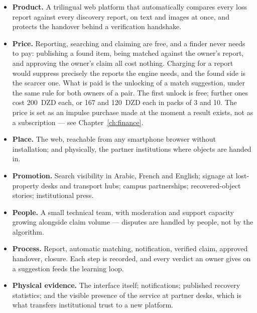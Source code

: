 \begin{itemize}[leftmargin=1.4em,itemsep=4pt]
  \item \textbf{Product.} A trilingual web platform that automatically compares
        every loss report against every discovery report, on text and images at
        once, and protects the handover behind a verification handshake.

  \item \textbf{Price.} Reporting, searching and claiming are free, and a finder
        never needs to pay: publishing a found item, being matched against the
        owner's report, and approving the owner's claim all cost nothing.
        Charging for a report would suppress precisely the reports the engine
        needs, and the found side is the scarcer one. What is paid is the
        unlocking of a match suggestion, under the same rule for both owners of
        a pair. The first unlock is free; further ones cost 200~DZD each, or 167
        and 120~DZD each in packs of 3 and 10. The price is set as an impulse
        purchase made at the moment a result exists, not as a subscription ---
        see Chapter~\ref{ch:finance}.

  \item \textbf{Place.} The web, reachable from any smartphone browser without
        installation; and physically, the partner institutions where objects are
        handed in.

  \item \textbf{Promotion.} Search visibility in Arabic, French and English;
        signage at lost-property desks and transport hubs; campus partnerships;
        recovered-object stories; institutional press.

  \item \textbf{People.} A small technical team, with moderation and support
        capacity growing alongside claim volume --- disputes are handled by
        people, not by the algorithm.

  \item \textbf{Process.} Report, automatic matching, notification, verified
        claim, approved handover, closure. Each step is recorded, and every
        verdict an owner gives on a suggestion feeds the learning loop.

  \item \textbf{Physical evidence.} The interface itself; notifications;
        published recovery statistics; and the visible presence of the service
        at partner desks, which is what transfers institutional trust to a new
        platform.
\end{itemize}

